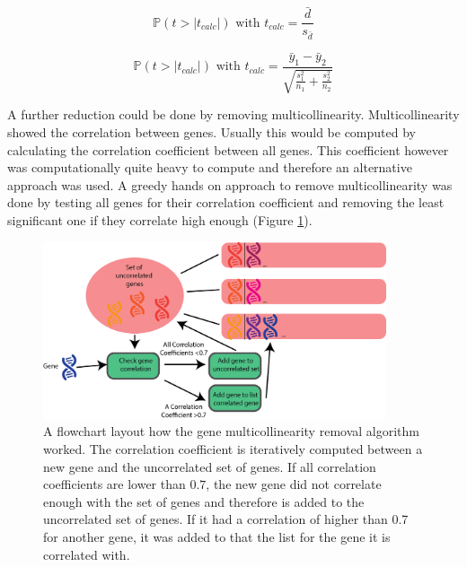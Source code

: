 \documentclass[10pt,a4paper]{article}
\begin{document}
	\begin{equation}
	\label{eq:PairedTTest}
	\mathbb{P}(t > |t_{calc}|) \text{ with } t_{calc} =\frac{\bar{d}}{s_{\bar{d}}}
	\end{equation}
	
	\begin{equation}
	\label{eq:UnequalVarianceTTest}
	\mathbb{P}(t >|t_{calc}|) \text { with } t_{calc} = \frac{\bar{y}_1 - 
		\bar{y}_2}{\sqrt{\frac{s^2_1}{n_1} + \frac{s^2_2}{n_2}}} 
	\end{equation}
	
	A further reduction could be done by removing multicollinearity. Multicollinearity showed the correlation between genes. Usually this would be computed by calculating the correlation coefficient between all genes. This coefficient however was computationally quite heavy to compute and therefore an alternative approach was used. A greedy hands on approach to remove multicollinearity was done by testing all genes for their correlation coefficient and removing the least significant one if they correlate high enough (Figure \ref{fig:GreedyCorrelationClustering}).
	
	\begin{figure}[H]
		\includegraphics[width=0.9\textwidth]{GreedyClustering.png}
		\caption{A flowchart layout how the gene multicollinearity removal algorithm worked. The correlation coefficient is iteratively computed between a new gene and the uncorrelated set of genes. If all correlation coefficients are lower than $0.7$, the new gene did not correlate enough with the set of genes and therefore is added to the uncorrelated set of genes. If it had a correlation of higher than 0.7 for another gene, it was added to that the list for the gene it is correlated with.}
		\label{fig:GreedyCorrelationClustering}
	\end{figure}
	
\end{document}
